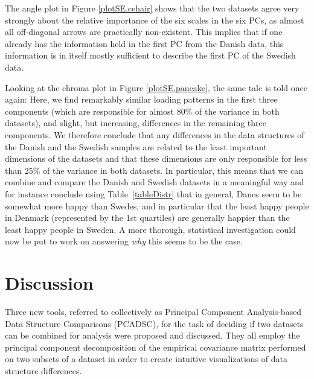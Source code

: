 \documentclass[a4paper,12pt]{article}
\begin{document}
The angle plot in Figure \ref{plotSE.cehair} shows that the two datasets agree very strongly about the relative importance of the six scales in the six PCs, as almost all off-diagonal arrows are practically non-existent. This implies that if one already has the information held in the first PC from the Danish data, this information is in itself mostly sufficient to describe the first PC of the Swedish data.

Looking at the chroma plot in Figure \ref{plotSE.pancake}, the same tale is told once again: Here, we find remarkably similar loading patterns in the first three components (which are responsible for almost 80\% of the variance in both datasets), and slight, but increasing, differences in the remaining three components. We therefore conclude that any differences in the data structures of the Danish and the Swedish samples are related to the least important dimensions of the datasets and that these dimensions are only responsible for less than 25\% of the variance in both datasets. In particular, this means that we can combine and compare the Danish and Swedish datasets in a meaningful way and for instance conclude using Table~\ref{tableDistr} that in general, Danes seem to be somewhat more happy than Swedes, and in particular that the least happy people in Denmark (represented by the 1st quartiles) are generally happier than the least happy people in Sweden. A more thorough, statistical investigation could now be put to work on answering \textit{why} this seems to be the case.



\section*{Discussion}\label{sec.Discussion}


Three new tools, referred to collectively as Principal Component Analysis-based Data Structure Comparisons (PCADSC), for the task of deciding if two datasets can be combined for analysis were proposed and discussed. They all employ the principal component decomposition of the empirical covariance matrix performed on two subsets of a dataset in order to create intuitive visualizations of data structure differences.
\end{document}
